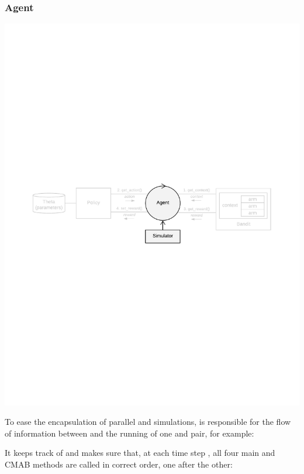 \documentclass{jss}
\begin{document}
\subsubsection{Agent}

\includegraphics[width=\textwidth]{fig/all_cmab_phases_Part2}

To ease the encapsulation of parallel  and  simulations,  is responsible for the flow of information between and the running of one  and  pair, for example:


It keeps track of  and makes sure that, at each time step , all four main  and  CMAB methods are called in correct order, one after the other:
\end{document}
